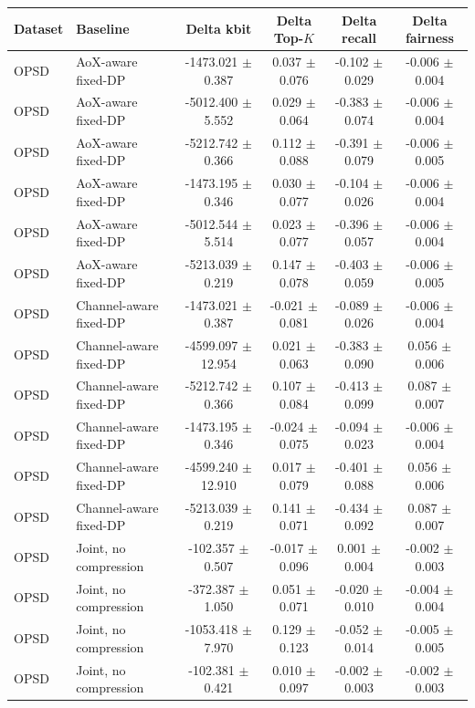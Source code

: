 \begin{tabular}{llcccc}
\toprule
Dataset & Baseline & Delta kbit & Delta Top-$K$ & Delta recall & Delta fairness \\
\midrule
OPSD & AoX-aware fixed-DP & -1473.021 $\pm$ 0.387 & 0.037 $\pm$ 0.076 & -0.102 $\pm$ 0.029 & -0.006 $\pm$ 0.004 \\
OPSD & AoX-aware fixed-DP & -5012.400 $\pm$ 5.552 & 0.029 $\pm$ 0.064 & -0.383 $\pm$ 0.074 & -0.006 $\pm$ 0.004 \\
OPSD & AoX-aware fixed-DP & -5212.742 $\pm$ 0.366 & 0.112 $\pm$ 0.088 & -0.391 $\pm$ 0.079 & -0.006 $\pm$ 0.005 \\
OPSD & AoX-aware fixed-DP & -1473.195 $\pm$ 0.346 & 0.030 $\pm$ 0.077 & -0.104 $\pm$ 0.026 & -0.006 $\pm$ 0.004 \\
OPSD & AoX-aware fixed-DP & -5012.544 $\pm$ 5.514 & 0.023 $\pm$ 0.077 & -0.396 $\pm$ 0.057 & -0.006 $\pm$ 0.004 \\
OPSD & AoX-aware fixed-DP & -5213.039 $\pm$ 0.219 & 0.147 $\pm$ 0.078 & -0.403 $\pm$ 0.059 & -0.006 $\pm$ 0.005 \\
OPSD & Channel-aware fixed-DP & -1473.021 $\pm$ 0.387 & -0.021 $\pm$ 0.081 & -0.089 $\pm$ 0.026 & -0.006 $\pm$ 0.004 \\
OPSD & Channel-aware fixed-DP & -4599.097 $\pm$ 12.954 & 0.021 $\pm$ 0.063 & -0.383 $\pm$ 0.090 & 0.056 $\pm$ 0.006 \\
OPSD & Channel-aware fixed-DP & -5212.742 $\pm$ 0.366 & 0.107 $\pm$ 0.084 & -0.413 $\pm$ 0.099 & 0.087 $\pm$ 0.007 \\
OPSD & Channel-aware fixed-DP & -1473.195 $\pm$ 0.346 & -0.024 $\pm$ 0.075 & -0.094 $\pm$ 0.023 & -0.006 $\pm$ 0.004 \\
OPSD & Channel-aware fixed-DP & -4599.240 $\pm$ 12.910 & 0.017 $\pm$ 0.079 & -0.401 $\pm$ 0.088 & 0.056 $\pm$ 0.006 \\
OPSD & Channel-aware fixed-DP & -5213.039 $\pm$ 0.219 & 0.141 $\pm$ 0.071 & -0.434 $\pm$ 0.092 & 0.087 $\pm$ 0.007 \\
OPSD & Joint, no compression & -102.357 $\pm$ 0.507 & -0.017 $\pm$ 0.096 & 0.001 $\pm$ 0.004 & -0.002 $\pm$ 0.003 \\
OPSD & Joint, no compression & -372.387 $\pm$ 1.050 & 0.051 $\pm$ 0.071 & -0.020 $\pm$ 0.010 & -0.004 $\pm$ 0.004 \\
OPSD & Joint, no compression & -1053.418 $\pm$ 7.970 & 0.129 $\pm$ 0.123 & -0.052 $\pm$ 0.014 & -0.005 $\pm$ 0.005 \\
OPSD & Joint, no compression & -102.381 $\pm$ 0.421 & 0.010 $\pm$ 0.097 & -0.002 $\pm$ 0.003 & -0.002 $\pm$ 0.003 \\

\end{tabular}
